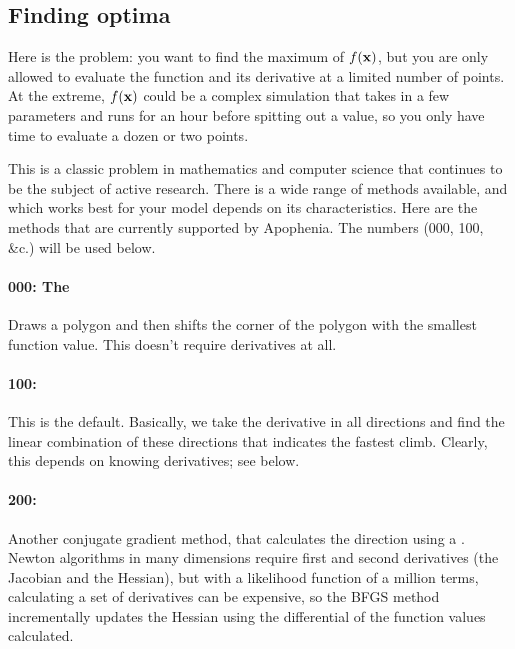 \subsection{Finding optima} Here is the problem: you want to find the
maximum of $f({\bf x})$, but you are only allowed to evaluate the function
and its derivative at a limited number of points. At the extreme,
$f({\bf x})$ could be a complex simulation that takes in a few parameters
and runs for an hour before spitting out a value, so you only have time
to evaluate a dozen or two points.

This is a classic problem in mathematics and computer science that
continues to be the subject of active research. There is a wide range of
methods available, and which works best for your model depends on its
characteristics. Here are the methods
that are currently supported by Apophenia. The numbers (000, 100, \&c.)
will be used below.

\paragraph{000: The } Draws a polygon and
then shifts the corner of the polygon with the smallest function value.
This doesn't require derivatives at all.

\paragraph{100: } This is the
default. Basically, we take the derivative in all directions and find
the linear combination of these directions that indicates the fastest
climb. Clearly, this depends on knowing derivatives; see below.

\paragraph{200: }  Another conjugate gradient method, that calculates the
direction using a . Newton algorithms
in many dimensions require first and second derivatives (the Jacobian
and the Hessian), but with a likelihood function of a million terms,
calculating a set of derivatives can be expensive, so the BFGS method
incrementally updates the Hessian using the differential of the function
values calculated.

